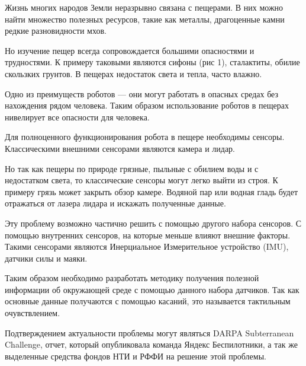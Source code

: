 
{\actuality} Жизнь многих народов Земли неразрывно связана с пещерами. В них можно найти множество полезных ресурсов, такие как металлы, драгоценные камни редкие разновидности мхов.

Но изучение пещер всегда сопровождается большими опасностями и
трудностями. К примеру таковыми являются сифоны (рис 1), сталактиты, обилие скользких
грунтов. В пещерах недостаток света и тепла, часто влажно.

Одно из преимуществ роботов --- они могут работать в опасных средах без нахождения рядом человека. Таким образом использование роботов в пещерах нивелирует все опасности для человека.

Для полноценного функционирования робота в пещере необходимы сенсоры. Классическими внешними сенсорами являются камера и лидар.

Но так как пещеры по природе грязные, пыльные с обилием воды и с
недостатком света, то классические сенсоры могут легко выйти из строя. К примеру грязь может закрыть обзор камере. Водяной пар или водная гладь будет отражаться от лазера лидара и искажать полученные данные.

Эту проблему возможно частично решить с помощью другого набора сенсоров. С помощью внутренних сенсоров, на которые меньше влияют внешние факторы. Такими сенсорами являются Инерциальное Измерительное устройство (IMU), датчики силы и маяки.

Таким образом необходимо разработать методику получения полезной информации об окружающей среде с помощью данного набора датчиков. Так как основные данные получаются с помощью касаний, это называется тактильным очувствлением.

Подтверждением актуальности проблемы могут являться DARPA Subterranean Challenge, отчет, который опубликовала команда Яндекс Беспилотники, а так же выделенные средства фондов НТИ и РФФИ на решение этой проблемы.


